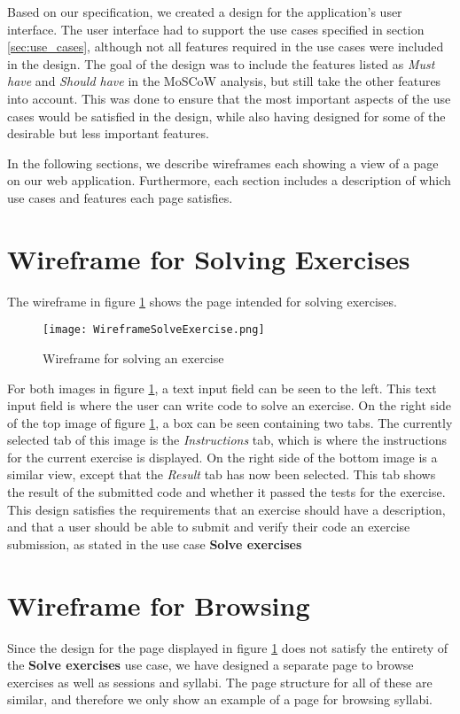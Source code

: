 Based on our specification, we created a design for the application's user interface. The user interface had to support the use cases specified in section \ref*{sec:use_cases}, although not all features required in the use cases were included in the design. The goal of the design was to include the features listed as \textit{Must have} and \textit{Should have} in the MoSCoW analysis, but still take the other features into account. This was done to ensure that the most important aspects of the use cases would be satisfied in the design, while also having designed for some of the desirable but less important features.

In the following sections, we describe wireframes each showing a view of a page on our web application. Furthermore, each section includes a description of which use cases and features each page satisfies.

\section{Wireframe for Solving Exercises}
The wireframe in figure \ref{fig:wfExercise} shows the page intended for solving exercises.
\begin{figure}[H]
	\texttt{[image: WireframeSolveExercise.png]}
	\centering
	\caption{Wireframe for solving an exercise}
	\label{fig:wfExercise}
\end{figure}

For both images in figure \ref{fig:wfExercise}, a text input field can be seen to the left. This text input field is where the user can write code to solve an exercise. On the right side of the top image of figure \ref{fig:wfExercise}, a box can be seen containing two tabs. The currently selected tab of this image is the \textit{Instructions} tab, which is where the instructions for the current exercise is displayed. On the right side of the bottom image is a similar view, except that the \textit{Result} tab has now been selected. This tab shows the result of the submitted code and whether it passed the tests for the exercise. This design satisfies the requirements that an exercise should have a description, and that a user should be able to submit and verify their code an exercise submission, as stated in the use case \textbf{Solve exercises}

\section{Wireframe for Browsing}
Since the design for the page displayed in figure \ref{fig:wfExercise} does not satisfy the entirety of the \textbf{Solve exercises} use case, we have designed a separate page to browse exercises as well as sessions and syllabi. The page structure for all of these are similar, and therefore we only show an example of a page for browsing syllabi.

